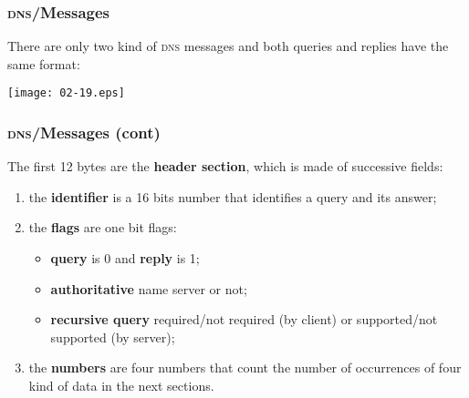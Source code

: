 %
\begin{frame}
\frametitle{\textsc{dns}/Messages}

\vspace*{-1pt}

There are only two kind of \textsc{dns} messages and both queries and
replies have the same format:
\begin{center}
\texttt{[image: 02-19.eps]}
\end{center}

\end{frame}

%
\begin{frame}
\frametitle{\textsc{dns}/Messages (cont)}

The first 12 bytes are the \textbf{header section}, which is made of
successive fields:
\begin{enumerate}

  \item the \textbf{identifier} is a 16 bits number that identifies
    a query and its answer;

  \item the \textbf{flags} are one bit flags:
  \begin{itemize}

    \item \textbf{query} is 0 and \textbf{reply} is 1;

    \item \textbf{authoritative} name server or not;

    \item \textbf{recursive query} required/not required (by client)
    or supported/not supported (by server);

  \end{itemize}

  \item the \textbf{numbers} are four numbers that count the number of
    occurrences of four kind of data in the next sections.
 
\end{enumerate}

\end{frame}

